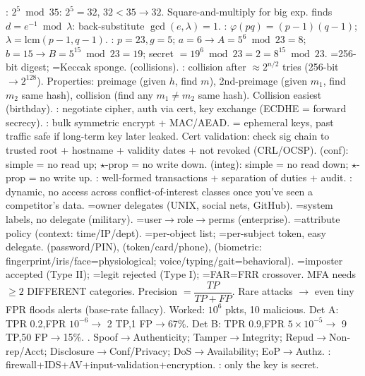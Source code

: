 : $2^5\bmod35$: $2^5{=}32$, $32{<}35\to32$. Square-and-multiply for big exp.  finds $d=e^{-1}\bmod\lambda$: back-substitute $\gcd(e,\lambda){=}1$. : $\varphi(pq){=}(p{-}1)(q{-}1)$; $\lambda{=}\mathrm{lcm}(p{-}1,q{-}1)$. : $p{=}23,g{=}5$; $a{=}6\to A{=}5^6\bmod23{=}8$; $b{=}15\to B{=}5^{15}\bmod23{=}19$; secret $=19^6\bmod23=2=8^{15}\bmod23$.
=256-bit digest; =Keccak sponge.  (collisions). : collision after $\approx2^{n/2}$ tries (256-bit$\to2^{128}$). Properties: preimage (given $h$, find $m$), 2nd-preimage (given $m_1$, find $m_2$ same hash), collision (find any $m_1{\ne}m_2$ same hash). Collision easiest (birthday).
: negotiate cipher, auth via cert, key exchange (ECDHE = forward secrecy). : bulk symmetric encrypt + MAC/AEAD.  = ephemeral keys, past traffic safe if long-term key later leaked. Cert validation: check sig chain to trusted root + hostname + validity dates + not revoked (CRL/OCSP).
 (conf): simple = no read up; $\star$-prop = no write down.  (integ): simple = no read down; $\star$-prop = no write up. : well-formed transactions + separation of duties + audit. : dynamic, no access across conflict-of-interest classes once you've seen a competitor's data.
=owner delegates (UNIX, social nets, GitHub). =system labels, no delegate (military). =user$\to$role$\to$perms (enterprise). =attribute policy (context: time/IP/dept). =per-object list; =per-subject token, easy delegate.
 (password/PIN),  (token/card/phone),  (biometric: fingerprint/iris/face=physiological; voice/typing/gait=behavioral). =imposter accepted (Type II); =legit rejected (Type I); =FAR=FRR crossover. MFA needs $\ge2$ DIFFERENT categories.
Precision $=\dfrac{TP}{TP+FP}$. Rare attacks $\to$ even tiny FPR floods alerts (base-rate fallacy). Worked: $10^6$ pkts, 10 malicious. Det A: TPR 0.2,FPR $10^{-6}\to$ 2 TP,1 FP$\to$67\%. Det B: TPR 0.9,FPR $5{\times}10^{-5}\to$ 9 TP,50 FP$\to$15\%. .
Spoof$\to$Authenticity; Tamper$\to$Integrity; Repud$\to$Non-rep/Acct; Disclosure$\to$Conf/Privacy; DoS$\to$Availability; EoP$\to$Authz. : firewall+IDS+AV+input-validation+encryption. : only the key is secret.
